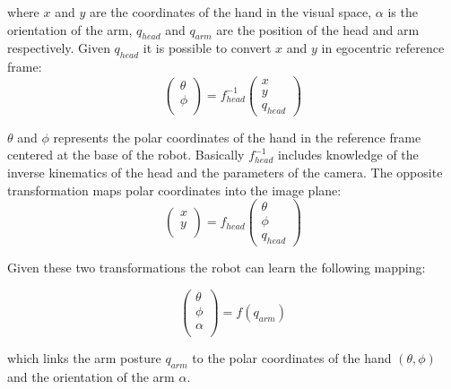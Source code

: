 where $x$ and $y$ are the coordinates of the hand in the visual space,
$\alpha$ is the orientation of the arm, $q_{head}$ and $q_{arm}$ are 
the position of the head and arm respectively. Given $q_{head}$ it is
possible to convert $x$ and $y$ in egocentric reference frame:
\begin{equation}
  \left(\begin{array}{c}
    \theta \\
    \phi \\
    \end{array}\right)
  = f_{head}^{-1}
  \left(\begin{array}{c}
    x \\
    y \\
    q_{head}
    \end{array} \right)
\label{eq-head-inverse}
\end{equation}

$\theta$ and $\phi$ represents the polar coordinates of the hand in the
reference frame centered at the base of the robot. Basically 
$f_{head}^{-1}$ includes knowledge of the inverse kinematics of the 
head and the parameters of the camera. The opposite transformation maps 
polar coordinates into the image plane:
\begin{equation}
  \left(\begin{array}{c}
    x \\
    y \\
    \end{array}\right)
  = f_{head}
  \left(\begin{array}{c}
    \theta \\
    \phi \\
    q_{head}
    \end{array} \right)
\label{eq-head-direct}
\end{equation}

Given these two transformations the robot can learn the following mapping:

\begin{equation}
  \left(\begin{array}{c}
    \theta \\
    \phi \\
    \alpha \\ 
    \end{array}\right)
  = f \left(q_{arm}\right)
\label{eq-arm-direct}
\end{equation}

which links the arm posture $q_{arm}$ to the polar coordinates of the 
hand $\left(\theta, \phi\right)$ and the orientation of the arm $\alpha$. 

